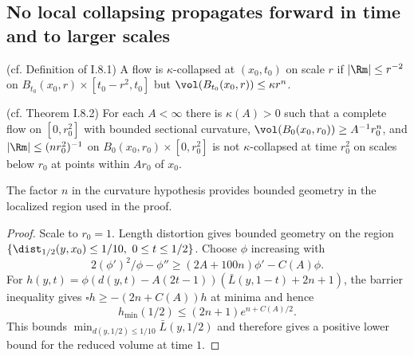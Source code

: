 \subsection{No local collapsing propagates forward in time and to larger scales}
\begin{definition}
  \label{def:kl-no-local-collapsing-propagates-forward-time-larger-scales-kappa-solutions-definition}
  \leanok
  (cf. Definition of I.8.1)
A flow is $\kappa$-collapsed at $(x_0,t_0)$ on scale $r$ if
$|\Rm|\le r^{-2}$ on $B_{t_0}(x_0,r)\times[t_0-r^2,t_0]$ but
$\vol(B_{t_0}(x_0,r))\le\kappa r^n$.
\end{definition}
\begin{theorem}
  \label{thm:kl-no-local-collapsing-propagates-forward-time-larger-scales-existence-kappa-solutions}
  (cf. Theorem I.8.2) \label{8.2thm}
For each $A<\infty$ there is $\kappa(A)>0$ such that a complete flow on
$[0,r_0^2]$ with bounded sectional curvature, $\vol(B_0(x_0,r_0))\ge A^{-1}r_0^n$,
and $|\Rm|\le(nr_0^2)^{-1}$ on $B_0(x_0,r_0)\times[0,r_0^2]$ is not
$\kappa$-collapsed at time $r_0^2$ on scales below $r_0$ at points within
$Ar_0$ of $x_0$.
\end{theorem}
\begin{remark}
  \label{rem:kl-no-local-collapsing-propagates-forward-time-larger-scales-estimates-no-local-collapsing-propagates-forward-time-larger-scales}
  \label{8.2fix}
The factor $n$ in the curvature hypothesis provides bounded geometry in the
localized region used in the proof.
\end{remark}
\begin{proof}
\sketch
Scale to $r_0=1$. Length distortion gives bounded geometry on the region
$\{\dist_{1/2}(y,x_0)\le1/10,\ 0\le t\le1/2\}$. Choose $\phi$ increasing with
\begin{equation}\label{phieqn}2(\phi')^2/\phi-\phi''\ge(2A+100n)\phi'-C(A)\phi.\end{equation}
For $h(y,t)=\phi(d(y,t)-A(2t-1))(\bar L(y,1-t)+2n+1)$, the barrier inequality gives
$\square h\ge-(2n+C(A))h$ at minima and hence
\begin{equation}h_{\min}(1/2)\le(2n+1)e^{n+C(A)/2}.
\end{equation}
This bounds $\min_{d(y,1/2)\le1/10}\bar L(y,1/2)$ and therefore gives a positive
lower bound for the reduced volume at time $1$.
\end{proof}

